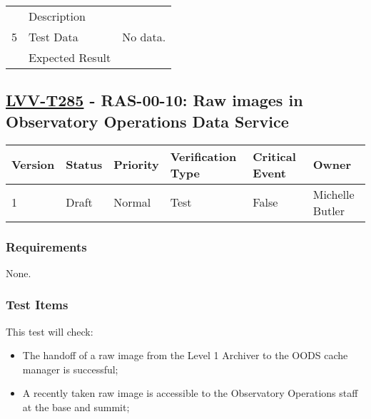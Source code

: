 \begin{longtable}[]{p{1.3cm}p{2cm}p{13cm}}
            \multirow{3}{*}{ 5 } & Description &
            \begin{minipage}[t]{13cm}{\footnotesize
            
            \vspace{\dp0}
            } \end{minipage} \\ \cline{2-3}
            & Test Data &
            \begin{minipage}[t]{13cm}{\footnotesize
                No data.
                \vspace{\dp0}
            } \end{minipage} \\ \cline{2-3}
            & Expected Result &
        \\ \midrule
    \end{longtable}

\subsection{\href{https://jira.lsstcorp.org/secure/Tests.jspa\#/testCase/LVV-T285}{LVV-T285}
    - RAS-00-10: Raw images in Observatory Operations Data Service}\label{lvv-t285}

\begin{longtable}[]{llllll}
\toprule
Version & Status & Priority & Verification Type & Critical Event & Owner
\\\midrule
1 & Draft & Normal &
Test & False & Michelle Butler
\\\bottomrule
\end{longtable}

\subsubsection{Requirements}
    None.

\subsubsection{Test Items}
This test will check:

\begin{itemize}
\tightlist
\item
  The handoff of a raw image from the Level 1 Archiver to the OODS cache
  manager is successful;
\item
  A recently taken raw image is accessible to the Observatory Operations
  staff at the base and summit;
\end{itemize}


